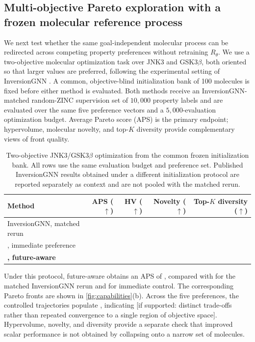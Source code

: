 \subsection{Multi-objective Pareto exploration with a frozen molecular reference process}
\label{sec:exp-pareto}

We next test whether the same goal-independent molecular process can be redirected across competing property preferences without retraining $R_\theta$. We use a two-objective molecular optimization task over JNK3 and GSK3$\beta$, both oriented so that larger values are preferred, following the experimental setting of InversionGNN \citep{niu2025inversiongnn}. A common, objective-blind initialization bank of 100 molecules is fixed before either method is evaluated. Both methods receive an InversionGNN-matched random-ZINC supervision set of $10{,}000$ property labels and are evaluated over the same five preference vectors and a $5{,}000$-evaluation optimization budget. Average Pareto score (APS) is the primary endpoint; hypervolume, molecular novelty, and top-$K$ diversity provide complementary views of front quality.

\begin{table}[!ht]
\centering
{\small
\begin{tabular}{lrrrr}
\toprule
Method & APS ($\uparrow$) & HV ($\uparrow$) & Novelty ($\uparrow$) & Top-$K$ diversity ($\uparrow$) \\
\midrule
InversionGNN, matched rerun & \XXX{} & \XXX{} & \XXX{} & \XXX{} \\
\method{}, immediate preference & \XXX{} & \XXX{} & \XXX{} & \XXX{} \\
\textbf{\method{}, future-aware} & \textbf{\XXX{}} & \textbf{\XXX{}} & \textbf{\XXX{}} & \textbf{\XXX{}} \\
\bottomrule
\end{tabular}}
\caption{\small Two-objective JNK3/GSK3$\beta$ optimization from the common frozen initialization bank. All rows use the same evaluation budget and preference set. Published InversionGNN results obtained under a different initialization protocol are reported separately as context and are not pooled with the matched rerun.}
\label{tab:pareto}
\end{table}

Under this protocol, future-aware \method{} obtains an APS of \XXX{}, compared with \XXX{} for the matched InversionGNN rerun and \XXX{} for immediate \method{} control. The corresponding Pareto fronts are shown in \cref{fig:capabilities}(b). Across the five preferences, the controlled trajectories populate \XXX{}, indicating {\color{red}[if supported: distinct trade-offs rather than repeated convergence to a single region of objective space]}. Hypervolume, novelty, and diversity provide a separate check that improved scalar performance is not obtained by collapsing onto a narrow set of molecules.

